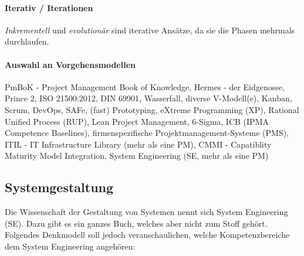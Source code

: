 \documentclass[a4paper]{article}
\begin{document}
			\paragraph{Iterativ / Iterationen}
			
			\textit{Inkrementell} und \textit{evolutionär} sind iterative Ansätze, da sie die Phasen mehrmals durchlaufen.
			
			\paragraph{Auswahl an Vorgehensmodellen}
			
			PmBoK - Project Management Book of Knowledge, 
			Hermes - der Eidgenosse, 
			Prince 2, 
			ISO 21500:2012, 
			DIN 69901, 
			Wasserfall, 
			diverse V-Modell(e), 
			Kanban, 
			Scrum, 
			DevOps, 
			SAFe, 
			(fast) Prototyping, 
			eXtreme Programming (XP), 
			Rational Unified Process (RUP), 
			Lean Project Management, 
			6-Sigma, 
			ICB (IPMA Competence Baselines), 
			firmenspezifische Projektmanagement-Systeme (PMS), 
			ITIL - IT Infrastructure Library (mehr als eine PM), 
			CMMI - Capatiblity Maturity Model Integration, 
			System Engineering (SE, mehr als eine PM)
			
\newpage
	
	\subsection{Systemgestaltung}
	
	Die Wissenschaft der Gestaltung von Systemen nennt sich System Engineering (SE).
	Dazu gibt es ein ganzes Buch, welches aber nicht zum Stoff gehört.
	Folgendes Denkmodell soll jedoch veranschaulichen, welche Kompetenzbereiche dem System Engineering angehören:
	
\end{document}
